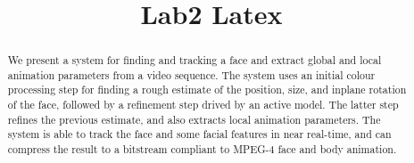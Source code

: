 \documentclass[12pt]{spieman}
\begin{document}
 

\title{Lab2 Latex}

\tableofcontents
\newpage


\begin{abstract}
We present a system for finding and tracking a face and extract global and local animation parameters from a video sequence. The system uses an initial colour processing step for finding a rough estimate of the position, size, and inplane rotation of the face, followed by a refinement step drived by an active model. The latter step refines the previous estimate, and also extracts local animation parameters. The system is able to track the face and some facial features in near real-time, and can compress the result to a bitstream compliant to MPEG-4 face and body animation. 
\end{abstract}

\end{document}
